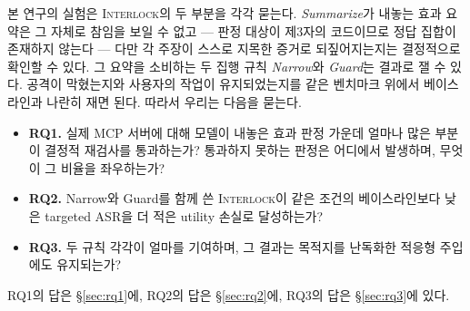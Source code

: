 \documentclass[acmsmall,screen,review,anonymous]{acmart}
\begin{document}
본 연구의 실험은 \textsc{Interlock}의 두 부분을 각각 묻는다. \emph{Summarize}가 내놓는 효과 요약은 그 자체로 참임을 보일 수 없고 --- 판정 대상이 제3자의 코드이므로 정답 집합이 존재하지 않는다 --- 다만 각 주장이 스스로 지목한 증거로 되짚어지는지는 결정적으로 확인할 수 있다. 그 요약을 소비하는 두 집행 규칙 \emph{Narrow}와 \emph{Guard}는 결과로 잴 수 있다. 공격이 막혔는지와 사용자의 작업이 유지되었는지를 같은 벤치마크 위에서 베이스라인과 나란히 재면 된다. 따라서 우리는 다음을 묻는다.

\begin{itemize}
    \item \textbf{RQ1.} 실제 MCP 서버에 대해 모델이 내놓은 효과 판정 가운데 얼마나 많은 부분이 결정적 재검사를 통과하는가? 통과하지 못하는 판정은 어디에서 발생하며, 무엇이 그 비율을 좌우하는가?
    \item \textbf{RQ2.} Narrow와 Guard를 함께 쓴 \textsc{Interlock}이 같은 조건의 베이스라인보다 낮은 targeted ASR을 더 적은 utility 손실로 달성하는가?
    \item \textbf{RQ3.} 두 규칙 각각이 얼마를 기여하며, 그 결과는 목적지를 난독화한 적응형 주입에도 유지되는가?
\end{itemize}

RQ1의 답은 \S\ref{sec:rq1}에, RQ2의 답은 \S\ref{sec:rq2}에, RQ3의 답은 \S\ref{sec:rq3}에 있다.
\end{document}
